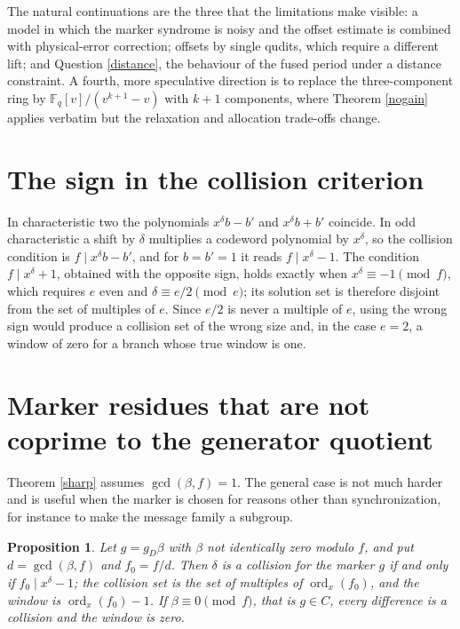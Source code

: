 \documentclass[11pt,reqno]{amsart}
\newtheorem{proposition}[theorem]{Proposition}
\theoremstyle{definition}
\theoremstyle{remark}
\newcommand{\F}{\mathbb{F}}
\newcommand{\ord}{\operatorname{ord}}
\begin{document}
The natural continuations are the three that the limitations make visible: a model in which the marker syndrome is noisy and the offset estimate is combined with physical-error correction; offsets by single qudits, which require a different lift; and Question \ref{distance}, the behaviour of the fused period under a distance constraint. A fourth, more speculative direction is to replace the three-component ring by $\F_q[v]/(v^{k+1}-v)$ with $k+1$ components, where Theorem \ref{nogain} applies verbatim but the relaxation and allocation trade-offs change.


\appendix

\section{The sign in the collision criterion}\label{sec:appendix-the-sign-in-the-collision-criterion}

In characteristic two the polynomials $x^\delta b-b'$ and $x^\delta b+b'$ coincide. In odd characteristic a shift by $\delta$ multiplies a codeword polynomial by $x^\delta$, so the collision condition is $f\mid x^\delta b-b'$, and for $b=b'=1$ it reads $f\mid x^\delta-1$. The condition $f\mid x^\delta+1$, obtained with the opposite sign, holds exactly when $x^\delta\equiv-1\pmod f$, which requires $e$ even and $\delta\equiv e/2\pmod e$; its solution set is therefore disjoint from the set of multiples of $e$. Since $e/2$ is never a multiple of $e$, using the wrong sign would produce a collision set of the wrong size and, in the case $e=2$, a window of zero for a branch whose true window is one.


\section{Marker residues that are not coprime to the generator quotient}\label{sec:appendix-marker-residues-that-are-not-coprime-to-the-generator-quotient}

Theorem \ref{sharp} assumes $\gcd(\beta,f)=1$. The general case is not much harder and is useful when the marker is chosen for reasons other than synchronization, for instance to make the message family a subgroup.


\begin{proposition}\label{residue}
Let $g=g_D\beta$ with $\beta$ not identically zero modulo $f$, and put $d=\gcd(\beta,f)$ and $f_0=f/d$. Then $\delta$ is a collision for the marker $g$ if and only if $f_0\mid x^\delta-1$; the collision set is the set of multiples of $\ord_x(f_0)$, and the window is $\ord_x(f_0)-1$. If $\beta\equiv0\pmod f$, that is $g\in C$, every difference is a collision and the window is zero.
\end{proposition}
\end{document}

